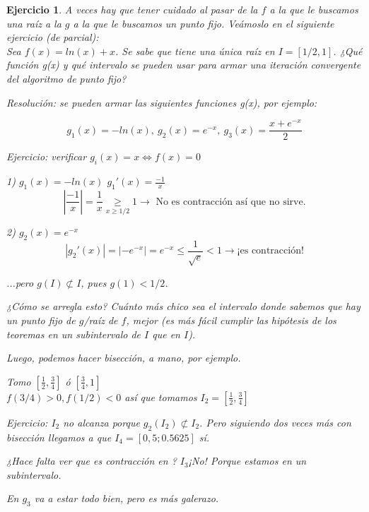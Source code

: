 \documentclass{article}
\newtheorem{exercise}{Ejercicio}
\begin{document}
\begin{exercise}
    A veces hay que tener cuidado al pasar de la $f$ a la que le buscamos una raíz a la $g$ a la que le buscamos un punto fijo. Veámoslo en el siguiente ejercicio (de parcial): \\
    
    Sea $f(x)= ln(x) + x$. Se sabe que tiene una única raíz en $I= [1/2,1]$. ¿Qué función g(x) y qué intervalo se pueden usar para armar una iteración convergente del algoritmo de punto fijo?
    
    Resolución: se pueden armar las siguientes funciones g(x), por ejemplo: \bigskip
    
    $$g_1(x)=-ln(x),\ g_2(x)=e^{-x},\ g_3(x) = \frac{x+e^{-x}}{2}$$
    
    Ejercicio: verificar $g_i(x) = x \Leftrightarrow f(x) = 0$
    
    1) $g_1(x) = -ln(x)$
    $g_1'(x)=\frac{-1}{x}$\\
    $$|\frac{-1}{x}| = \frac{1}{x} \underset{x \geq 1/2}{\geq} 1 \rightarrow \text{ No es contracción así que no sirve.} $$
    
    
    2) $g_2(x) = e^{-x}$
    $$|g_2'(x)| = |-e^{-x}| = e^{-x} \leq \frac{1}{\sqrt{e}} < 1 \rightarrow \text{¡es contracción!}$$
    
    ...pero $g(I) \not\subset I$, pues $g(1) < 1/2$.
    
    ¿Cómo se arregla esto? Cuánto más chico sea el intervalo donde sabemos que hay un punto fijo de $g$/raíz de $f$, mejor (es más fácil cumplir las hipótesis de los teoremas en un subintervalo de $I$ que en $I$).
    
    Luego, podemos hacer bisección, a mano, por ejemplo.
    
    Tomo $[\frac{1}{2},\frac{3}{4}]$ ó $[\frac{3}{4},1]$ \\
    
    $f(3/4) > 0, f(1/2) < 0$ así que tomamos $I_2 = [\frac{1}{2},\frac{3}{4}]$
    
    Ejercicio: $I_2$ no alcanza porque $g_2(I_2) \not\subset I_2$.  Pero siguiendo dos veces más con bisección  llegamos a que $I_4 = [0,5;0.5625]$ sí.
    
    ¿Hace falta ver que es contracción en ? $I_3$¡No! Porque estamos en un subintervalo. \bigskip
    
    En $g_3$ va a estar todo bien, pero es más galerazo.
    
    
    
\end{exercise}
\end{document}

